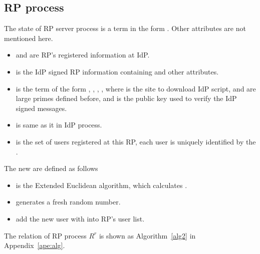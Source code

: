 \begin{appendices}
\subsection{RP process}
The state of RP server process is a term in the form . Other attributes are not mentioned here.
\begin{itemize}
\item {} and  are RP's registered information at IdP.
\item {} is the IdP signed RP information containing  and other attributes.
\item {} is the term of the form , , , , where  is the site to download IdP script,  and  are large primes defined before, and  is the public key used to verify the IdP signed messages.
\item {} is same as it in IdP process.
\item {} is the set of users registered at this RP, each user is uniquely identified by the .
\end{itemize}
 The new  are defined as follows
 \begin{itemize}
 \item {} is the Extended Euclidean algorithm, which calculates  .
  \item {} generates a fresh random number.
  \item {} add the new user with  into RP's user list.
 \end{itemize}
The relation of RP process $R^r$ is shown as Algorithm~\ref{alg2} in Appendix~\ref{ape:alg}.





\end{appendices}
